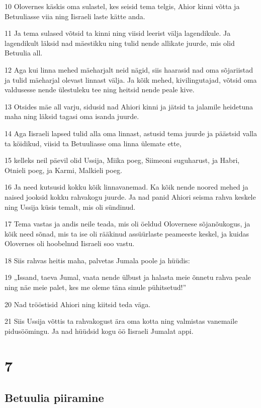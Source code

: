 \par 10 Olovernes käskis oma sulastel, kes seisid tema telgis, Ahior kinni võtta ja Betuuliasse viia ning Iisraeli laste kätte anda.
\par 11 Ja tema sulased võtsid ta kinni ning viisid leerist välja lagendikule. Ja lagendikult läksid nad mäestikku ning tulid nende allikate juurde, mis olid Betuulia all.
\par 12 Aga kui linna mehed mäeharjalt neid nägid, siis haarasid nad oma sõjariistad ja tulid mäeharjal olevast linnast välja. Ja kõik mehed, kivilingutajad, võtsid oma valdusesse nende ülestuleku tee ning heitsid nende peale kive.
\par 13 Otsides mäe all varju, sidusid nad Ahiori kinni ja jätsid ta jalamile heidetuna maha ning läksid tagasi oma isanda juurde.
\par 14 Aga Iisraeli lapsed tulid alla oma linnast, astusid tema juurde ja päästsid valla ta köidikud, viisid ta Betuuliasse oma linna ülemate ette,
\par 15 kelleks neil päevil olid Ussija, Miika poeg, Siimeoni suguharust, ja Habri, Otnieli poeg, ja Karmi, Malkieli poeg.
\par 16 Ja need kutsusid kokku kõik linnavanemad. Ka kõik nende noored mehed ja naised jooksid kokku rahvakogu juurde. Ja nad panid Ahiori seisma rahva keskele ning Ussija küsis temalt, mis oli sündinud.
\par 17 Tema vastas ja andis neile teada, mis oli öeldud Olovernese sõjanõukogus, ja kõik need sõnad, mis ta ise oli rääkinud assüürlaste peameeste keskel, ja kuidas Olovernes oli hoobelnud Iisraeli soo vastu.
\par 18 Siis rahvas heitis maha, palvetas Jumala poole ja hüüdis:
\par 19 „Issand, taeva Jumal, vaata nende ülbust ja halasta meie õnnetu rahva peale ning näe meie palet, kes me oleme täna sinule pühitsetud!”
\par 20 Nad trööstisid Ahiori ning kiitsid teda väga.
\par 21 Siis Ussija võttis ta rahvakogust ära oma kotta ning valmistas vanemaile pidusöömingu. Ja nad hüüdsid kogu öö Iisraeli Jumalat appi.


\chapter{7}

\section*{Betuulia piiramine}

